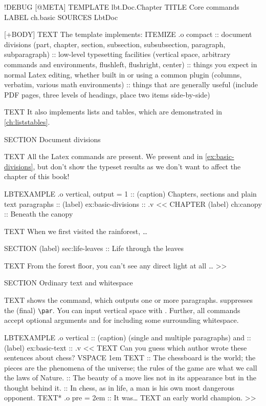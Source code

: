 \begin{lbt}
  !DEBUG
  [@META]
    TEMPLATE lbt.Doc.Chapter
    TITLE Core commands
    LABEL ch.basic
    SOURCES LbtDoc

  [+BODY]
    TEXT The  template implements:
    ITEMIZE .o compact
    :: document divisions (part, chapter, section, subsection, subsubsection, paragraph, subparagraph)
    :: low-level typesetting facilities (vertical space, arbitrary commands and environments, flushleft, flushright, center)
    :: things you expect in normal Latex editing, whether built in or using a common plugin (columns, verbatim, various math environments)
    :: things that are generally useful (include PDF pages, three levels of headings, place two items side-by-side)

    TEXT It also implements lists and tables, which are demonstrated in \vref{ch:liststables}.

    SECTION Document divisions

    TEXT All the Latex commands are present. We present  and  in \vref{ex:basic-divisions}, but don't show the typeset results as we don't want to affect the chapter of this book!

    LBTEXAMPLE .o vertical, output = 1
    :: (caption) Chapters, sections and plain text paragraphs
    :: (label) ex:basic-divisions
    :: .v <<
      CHAPTER (label) ch:canopy :: Beneath the canopy

      TEXT When we first visited the rainforest, \dots

      SECTION (label) sec:life-leaves :: Life through the leaves

      TEXT From the forest floor, you can't see any direct light at all \dots
    >>

    SECTION Ordinary text and whitespace

    TEXT  shows the  command, which outputs one or more paragraphs.  suppresses the (final) \verb|\par|. You can input vertical space with . Further, all commands accept optional arguments  and  for including some surrounding whitespace.

    LBTEXAMPLE .o vertical
    :: (caption)  (single and multiple paragraphs) and 
    :: (label) ex:basic-text
    :: .v <<
      TEXT Can you guess which author wrote these sentences about chess?
      VSPACE 1em
      TEXT
      :: The chessboard is the world; the pieces are the phenomena of the universe; the rules of the game are what we call the laws of Nature.
      :: The beauty of a move lies not in its appearance but in the thought behind it.
      :: In chess, as in life, a man is his own most dangerous opponent.
      TEXT* .o pre = 2em :: It was\dots
      TEXT an early world champion.
    >>


\end{lbt}
